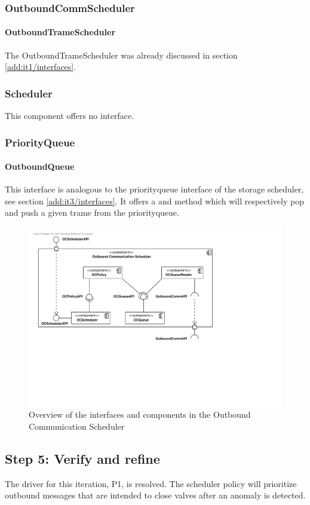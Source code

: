 \subsubsection{OutboundCommScheduler}

\paragraph{OutboundTrameScheduler}

\npar The OutboundTrameScheduler was already discussed in section
\ref{add:it1/interfaces}.

\subsubsection{Scheduler}

\npar This component offers no interface.

\subsubsection{PriorityQueue}

\paragraph{OutboundQueue}

\npar This interface is analogous to the priorityqueue interface of the storage
scheduler, see section \ref{add:it3/interfaces}. It offers a 
and  method which will respectively pop and push a given
trame from the priorityqueue.

\begin{figure}[H]
	\begin{centering}
		\includegraphics[width=\textwidth]{figs/add-it7-interfaces.pdf}
		\caption{Overview of the interfaces and components in the
		Outbound Communication Scheduler}
		\label{fig:it7/interfaces}
	\end{centering}
\end{figure}

\subsection{Step 5: Verify and refine}
\label{add:it7/verification}

\npar The driver for this iteration, P1, is resolved. The scheduler policy will
prioritize outbound messages that are intended to close valves after an anomaly
is detected.
